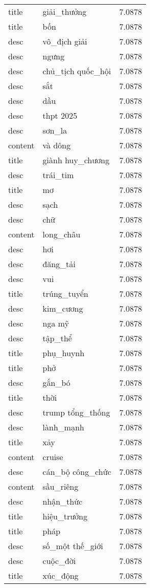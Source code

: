 \documentclass{article}
\begin{document}
\begin{tabular}{lll}
title & giải\_thưởng & 7.0878\\
title & bốn & 7.0878\\
desc & vô\_địch giải & 7.0878\\
desc & ngưng & 7.0878\\
desc & chủ\_tịch quốc\_hội & 7.0878\\
desc & sắt & 7.0878\\
desc & dầu & 7.0878\\
desc & thpt 2025 & 7.0878\\
desc & sơn\_la & 7.0878\\
content & và dông & 7.0878\\
title & giành huy\_chương & 7.0878\\
desc & trái\_tim & 7.0878\\
title & mơ & 7.0878\\
desc & sạch & 7.0878\\
desc & chữ & 7.0878\\
content & long\_châu & 7.0878\\
desc & hơi & 7.0878\\
desc & đăng\_tải & 7.0878\\
desc & vui & 7.0878\\
title & trúng\_tuyển & 7.0878\\
desc & kim\_cương & 7.0878\\
desc & nga mỹ & 7.0878\\
desc & tập\_thể & 7.0878\\
title & phụ\_huynh & 7.0878\\
title & phở & 7.0878\\
desc & gắn\_bó & 7.0878\\
title & thời & 7.0878\\
desc & trump tổng\_thống & 7.0878\\
desc & lành\_mạnh & 7.0878\\
title & xảy & 7.0878\\
content & cruise & 7.0878\\
desc & cán\_bộ công\_chức & 7.0878\\
content & sầu\_riêng & 7.0878\\
desc & nhận\_thức & 7.0878\\
title & hiệu\_trưởng & 7.0878\\
title & pháp & 7.0878\\
desc & số\_một thế\_giới & 7.0878\\
desc & cuộc\_đời & 7.0878\\
title & xúc\_động & 7.0878\\

\end{tabular}
\end{document}
